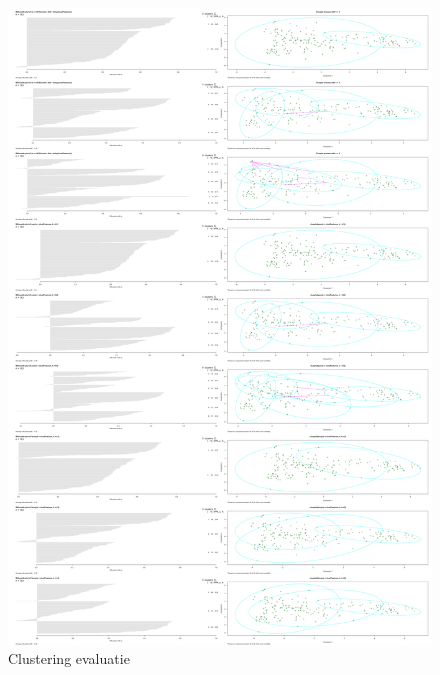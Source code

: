 \documentclass[a4paper,kulak]{kulakarticle}
\begin{document}
\begin{figure}[H]
	\centering
	\includegraphics[height=\textheight]{figures/clusteringEvaluationNoScaling.jpg}
	\caption{Clustering evaluatie}
	\label{fig:cne}
\end{figure}
\end{document}
